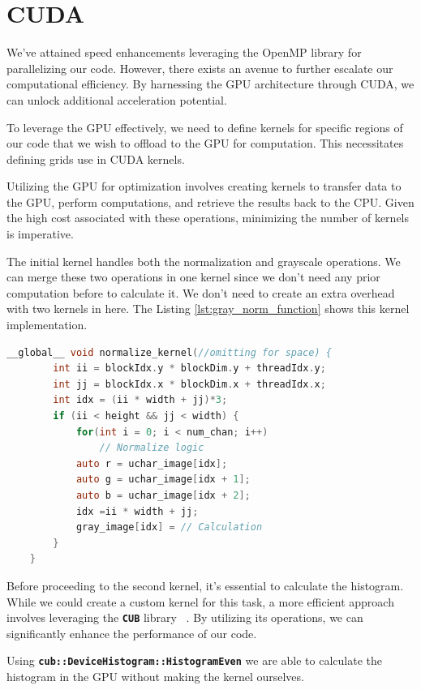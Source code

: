 \documentclass[sigconf]{acmart}
\begin{document}
\section{CUDA}
We've attained speed enhancements leveraging the OpenMP library for parallelizing our code. However, there exists an avenue to further escalate our computational efficiency. By harnessing the GPU architecture through CUDA, we can unlock additional acceleration potential.

To leverage the GPU effectively, we need to define kernels for specific regions of our code that we wish to offload to the GPU for computation. This necessitates defining grids use in CUDA kernels.

Utilizing the GPU for optimization involves creating kernels to transfer data to the GPU, perform computations, and retrieve the results back to the CPU. Given the high cost associated with these operations, minimizing the number of kernels is imperative.

The initial kernel handles both the normalization and grayscale operations. We can merge these two operations in one kernel since we don't need any prior computation before to calculate it. We don't need to create an extra overhead with two kernels in here. The Listing \ref{lst:gray_norm_function} shows this kernel implementation.

\begin{lstlisting}[language=C, caption=Grey Conversion and Normalization, label={lst:gray_norm_function}]
__global__ void normalize_kernel(//omitting for space) {
        int ii = blockIdx.y * blockDim.y + threadIdx.y;
        int jj = blockIdx.x * blockDim.x + threadIdx.x;
        int idx = (ii * width + jj)*3;
        if (ii < height && jj < width) {
            for(int i = 0; i < num_chan; i++) 
                // Normalize logic
            auto r = uchar_image[idx];
            auto g = uchar_image[idx + 1];
            auto b = uchar_image[idx + 2];
            idx =ii * width + jj;
            gray_image[idx] = // Calculation
        }
    }
\end{lstlisting}

Before proceeding to the second kernel, it's essential to calculate the histogram. While we could create a custom kernel for this task, a more efficient approach involves leveraging the \texttt{\textbf{CUB}} library ~\cite{cub}. By utilizing its operations, we can significantly enhance the performance of our code.

Using \texttt{\textbf{cub::DeviceHistogram::HistogramEven}} we are able to calculate the histogram in the GPU without making the kernel ourselves.
\end{document}
